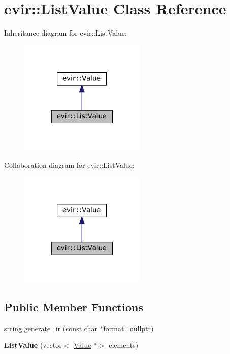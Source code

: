 \hypertarget{classevir_1_1ListValue}{}\section{evir\+:\+:List\+Value Class Reference}
\label{classevir_1_1ListValue}


Inheritance diagram for evir\+:\+:List\+Value\+:\nopagebreak
\begin{figure}[H]
\begin{center}
\leavevmode
\includegraphics[width=170pt]{classevir_1_1ListValue__inherit__graph}
\end{center}
\end{figure}


Collaboration diagram for evir\+:\+:List\+Value\+:\nopagebreak
\begin{figure}[H]
\begin{center}
\leavevmode
\includegraphics[width=170pt]{classevir_1_1ListValue__coll__graph}
\end{center}
\end{figure}
\subsection*{Public Member Functions}
\begin{DoxyCompactItemize}
\item 
string \hyperlink{classevir_1_1ListValue_aebd962d9117d8cd22d35bf217975dcff}{generate\+\_\+ir} (const char $\ast$format=nullptr)
\item 
\mbox{\label{classevir_1_1ListValue_a9382018da6050ec7308d0bb6e311cc30}} 
{\bfseries List\+Value} (vector$<$ \hyperlink{classevir_1_1Value}{Value} $\ast$$>$ elements)
\end{DoxyCompactItemize}
